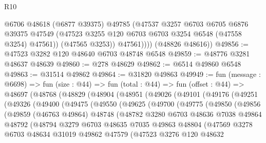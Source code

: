 \begin{lexlean}{R10}
\begin{coremodule}
                @6706
                @48618
                (@6877 @39375)
                @49785
                (@47537
                  @3257
                  @6703
                  @6705
                  @6876
                  @39375
                  @47549
                  (@47523 @3255 @120 @6703 @6703 @3254 @6548 (@47558 @3254) @47561))
                (@47565 @3253))
              @47561))))
      (@48826 @48616))
@49856 := @47523 @3282 @120 @48640 @6703 @48748 @6548
@49859 := @48776 @3281 @48637 @48639
@49860 := @278 @48629
@49862 := @6514 @49860 @6548
@49863 := @31514 @49862
@49864 := @31820 @49863
@49949 := fun (message : @6698) =>
  fun (size : @44) =>
  fun (total : @44) =>
  fun (offset : @44) =>
  @48697
    (@48768
      (@48829
        (@48904
          (@48951
            (@49026
              (@49101
                (@49176
                  (@49251
                    (@49326
                      (@49400
                        (@49475
                          (@49550
                            (@49625
                              (@49700
                                (@49775
                                  (@49850
                                    (@49856
                                      (@49859
                                        (@46763 @49864)
                                        @48748
                                        (@48782
                                          @3280
                                          @6703
                                          @48636
                                          @7038
                                          @49864
                                          @48792
                                          (@48794
                                            @3279
                                            @6703
                                            @48635
                                            @7035
                                            @49863
                                            @48804
                                            (@47569
                                              @3278
                                              @6703
                                              @48634
                                              @31019
                                              @49862
                                              @47579
                                              (@47523
                                                @3276
                                                @120
                                                @48632

\end{coremodule}
\end{lexlean}
